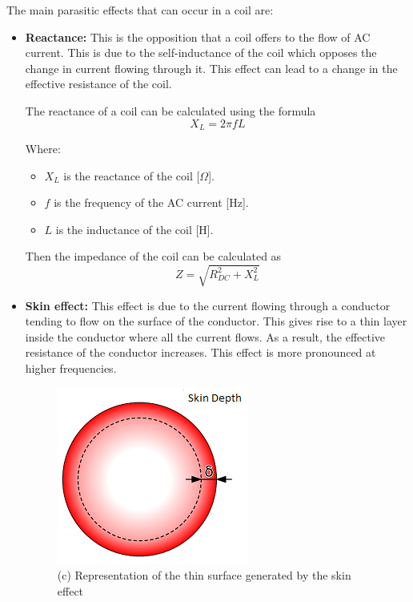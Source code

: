 The main parasitic effects that can occur in a coil are:
\begin{itemize}
    \item \textbf{Reactance:} This is the opposition that a coil offers to the flow of AC current. This is due to the self-inductance of the coil which opposes the change in current flowing through it. This effect can lead to a change in the effective resistance of the coil.
    
    The reactance of a coil can be calculated using the formula
    \begin{equation}
        X_L = 2 \pi f L
    \end{equation}
        
    Where:
    \begin{itemize}
        \item \( X_L \) is the reactance of the coil [\(\Omega\)].
        \item \( f \) is the frequency of the AC current [Hz].
        \item \( L \) is the inductance of the coil [H].
    \end{itemize}

    Then the impedance of the coil can be calculated as
    \begin{equation}
        Z = \sqrt{R_{DC}^2 + X_L^2}
    \end{equation}


    \item \textbf{Skin effect:} This effect is due to the current flowing through a conductor tending to flow on the surface of the conductor. This gives rise to a thin layer inside the conductor where all the current flows. As a result, the effective resistance of the conductor increases. This effect is more pronounced at higher frequencies.
    
    \begin{figure}[th]
        \centering
        \includegraphics[scale=0.4]{Chapters/Chapter2/Flexible_PCB_coils/Figures/skin_depth.png} %
        \caption[Skin depth]{(c) Representation of the thin surface generated by the skin effect}
        \label{fig:Skin depth}
    \end{figure}


\end{itemize}
